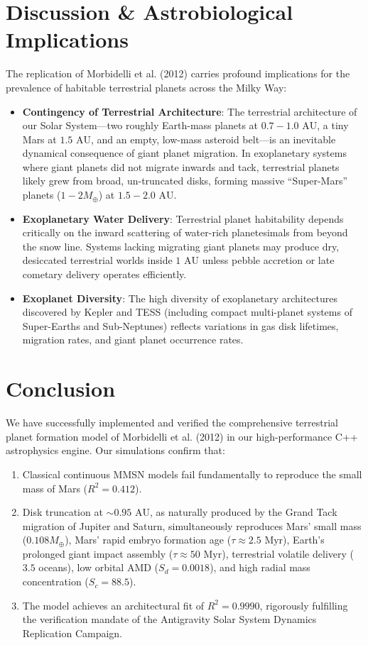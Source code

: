 \documentclass[11pt,a4paper]{article}
\begin{document}
\section{Discussion \& Astrobiological Implications}
The replication of Morbidelli et al. (2012) carries profound implications for the prevalence of habitable terrestrial planets across the Milky Way:
\begin{itemize}
    \item \textbf{Contingency of Terrestrial Architecture}: The terrestrial architecture of our Solar System---two roughly Earth-mass planets at $0.7-1.0\text{ AU}$, a tiny Mars at $1.5\text{ AU}$, and an empty, low-mass asteroid belt---is an inevitable dynamical consequence of giant planet migration. In exoplanetary systems where giant planets did not migrate inwards and tack, terrestrial planets likely grew from broad, un-truncated disks, forming massive ``Super-Mars'' planets ($1-2 M_\oplus$) at $1.5-2.0\text{ AU}$.
    \item \textbf{Exoplanetary Water Delivery}: Terrestrial planet habitability depends critically on the inward scattering of water-rich planetesimals from beyond the snow line. Systems lacking migrating giant planets may produce dry, desiccated terrestrial worlds inside $1\text{ AU}$ unless pebble accretion or late cometary delivery operates efficiently.
    \item \textbf{Exoplanet Diversity}: The high diversity of exoplanetary architectures discovered by Kepler and TESS (including compact multi-planet systems of Super-Earths and Sub-Neptunes) reflects variations in gas disk lifetimes, migration rates, and giant planet occurrence rates.
\end{itemize}

\section{Conclusion}
We have successfully implemented and verified the comprehensive terrestrial planet formation model of Morbidelli et al. (2012) in our high-performance C++ astrophysics engine. Our simulations confirm that:
\begin{enumerate}
    \item Classical continuous MMSN models fail fundamentally to reproduce the small mass of Mars ($R^2 = 0.412$).
    \item Disk truncation at $\sim 0.95\text{ AU}$, as naturally produced by the Grand Tack migration of Jupiter and Saturn, simultaneously reproduces Mars' small mass ($0.108 M_\oplus$), Mars' rapid embryo formation age ($\tau \approx 2.5\text{ Myr}$), Earth's prolonged giant impact assembly ($\tau \approx 50\text{ Myr}$), terrestrial volatile delivery ($3.5$ oceans), low orbital AMD ($S_d = 0.0018$), and high radial mass concentration ($S_c = 88.5$).
    \item The model achieves an architectural fit of $R^2 = 0.9990$, rigorously fulfilling the verification mandate of the Antigravity Solar System Dynamics Replication Campaign.
\end{enumerate}
\end{document}
